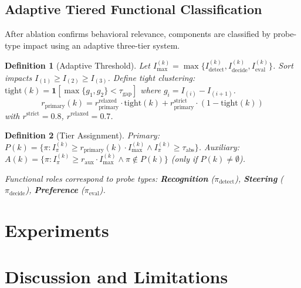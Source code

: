 \documentclass[11pt]{article}
\newtheorem{definition}{Definition}[section]
\begin{document}
\subsection{Adaptive Tiered Functional Classification}

After ablation confirms behavioral relevance, components are classified by probe-type impact using an adaptive three-tier system.

\begin{definition}[Adaptive Threshold]
Let $I_{\max}^{(k)} = \max\{I^{(k)}_{\text{detect}}, I^{(k)}_{\text{decide}}, I^{(k)}_{\text{eval}}\}$. Sort impacts $I_{(1)} \geq I_{(2)} \geq I_{(3)}$. Define tight clustering: $\text{tight}(k) = \mathbf{1}[\max\{g_1, g_2\} < \tau_{\text{gap}}]$ where $g_i = I_{(i)} - I_{(i+1)}$.
\begin{equation}
r_{\text{primary}}(k) = r_{\text{primary}}^{\text{relaxed}} \cdot \text{tight}(k) + r_{\text{primary}}^{\text{strict}} \cdot (1 - \text{tight}(k))
\end{equation}
with $r^{\text{strict}} = 0.8$, $r^{\text{relaxed}} = 0.7$.
\end{definition}

\begin{definition}[Tier Assignment]
Primary: $P(k) = \{\pi : I^{(k)}_\pi \geq r_{\text{primary}}(k) \cdot I_{\max}^{(k)} \land I^{(k)}_\pi \geq \tau_{\text{abs}}\}$. Auxiliary: $A(k) = \{\pi : I^{(k)}_\pi \geq r_{\text{aux}} \cdot I_{\max}^{(k)} \land \pi \notin P(k)\}$ (only if $P(k) \neq \emptyset$).

Functional roles correspond to probe types: \textbf{Recognition} ($\pi_{\text{detect}}$), \textbf{Steering} ($\pi_{\text{decide}}$), \textbf{Preference} ($\pi_{\text{eval}}$).
\end{definition}


\section{Experiments}
\label{sec:experiments}



\section{Discussion and Limitations}
\label{sec:limitations}
\end{document}
